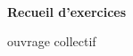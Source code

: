 \thispagestyle{premiere}

\begin{center}
 \ \vspace{5cm}
 
  \Huge \textbf{Recueil d'exercices}
  
  \vspace{1.5cm}
  \Large ouvrage collectif
  
  \vspace{3cm}
  \Large \textbf{\classes}
\end{center}
\newpage
